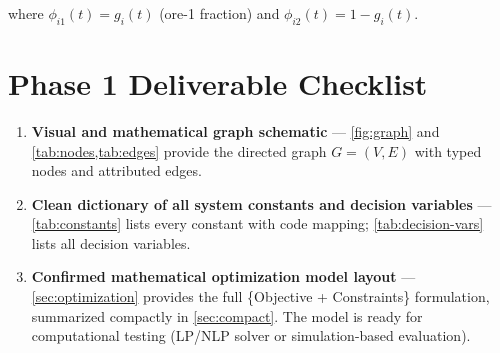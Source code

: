 \documentclass[11pt,a4paper]{article}
\theoremstyle{definition}
\begin{document}
where $\phi_{i1}(t) = g_i(t)$ (ore-1 fraction) and $\phi_{i2}(t) = 1 - g_i(t)$.


\section{Phase 1 Deliverable Checklist}
\label{sec:checklist}

\begin{enumerate}[label=\checkmark]
  \item \textbf{Visual and mathematical graph schematic} — \cref{fig:graph} and
        \cref{tab:nodes,tab:edges} provide the directed graph $G=(V,E)$ with
        typed nodes and attributed edges.
  \item \textbf{Clean dictionary of all system constants and decision variables}
        — \cref{tab:constants} lists every constant with code mapping;
        \cref{tab:decision-vars} lists all decision variables.
  \item \textbf{Confirmed mathematical optimization model layout} —
        \cref{sec:optimization} provides the full \{Objective + Constraints\}
        formulation, summarized compactly in \cref{sec:compact}.  The model is
        ready for computational testing (LP/NLP solver or simulation-based
        evaluation).
\end{enumerate}
\end{document}
